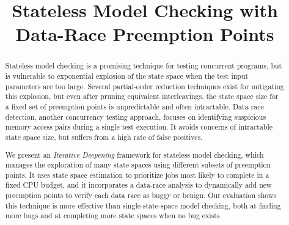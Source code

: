 \documentclass[pldi]{sigplanconf-pldi15}
\begin{document}
%
%

\newcommand\landslide{\textsc{Landslide}}
\newcommand\quicksand{\textsc{Quicksand}}

\newcommand\numthrlibs{{\Large \bf NUMP2S}}
\newcommand\numpintoses{{\Large \bf NUMPINTOSES}}
\newcommand\numstudence{{\Large \bf NUMSTUDENCE}} %

\title{Stateless Model Checking with Data-Race Preemption Points}

\maketitle
\begin{abstract}
Stateless model checking is a promising technique for testing concurrent programs,
but is vulnerable to exponential explosion of the state space when the test input parameters are too large.
Several partial-order reduction techniques exist for mitigating this explosion,
but even after pruning equivalent interleavings, the state space size for a fixed set of preemption points is unpredictable and often intractable.
%
Data race detection, another concurrency testing approach, focuses on identifying suspicious memory access pairs during a single test execution.
It avoids concerns of intractable state space size, but suffers from a high rate of false positives.

We present an {\em Iterative Deepening} framework for stateless model checking,
which manages the exploration of many state spaces using different subsets of preemption points.
It uses state space estimation to prioritize jobs most likely to complete in a fixed CPU budget,
and it incorporates a data-race analysis to dynamically add new preemption points to verify each data race as buggy or benign.
%
Our evaluation shows this technique is
more effective than single-state-space model checking, both at finding more bugs and at completing more state spaces when no bug exists.

\end{abstract}

\end{document}
